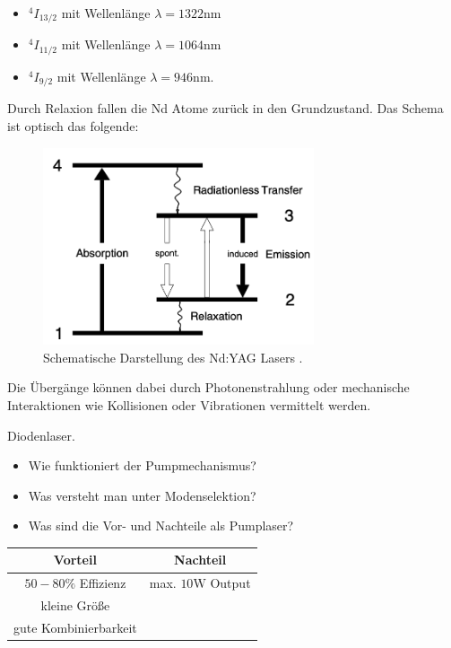 \documentclass{subfiles}
\begin{document}
\begin{Antwort}
            \begin{itemize}
                \item $^4I_{13/2}$ mit Wellenlänge $\lambda = 1322\si{\nano\meter}$
                \item $^4I_{11/2}$ mit Wellenlänge $\lambda = 1064\si{\nano\meter}$
                \item $^4I_{9/2}$ mit Wellenlänge $\lambda = 946\si{\nano\meter}$.
            \end{itemize}
            Durch Relaxion fallen die Nd Atome zurück in den Grundzustand. Das Schema ist optisch das folgende:
            \begin{figure}
                \centering
                \includegraphics[width=8cm]{Bilddateien/SchemaNdYAG.png}
                \caption{Schematische Darstellung des Nd:YAG Lasers \cite{exp8-paper}.}
                \label{fig:SchemaNdYAG}
            \end{figure}
            Die Übergänge können dabei durch Photonenstrahlung oder mechanische Interaktionen wie Kollisionen oder Vibrationen vermittelt werden. 
    \end{Antwort}

    \begin{Frage}
        Diodenlaser.
        \begin{itemize}[label=$\to$]
            \item Wie funktioniert der Pumpmechanismus?
            \item Was versteht man unter Modenselektion?
            \item Was sind die Vor- und Nachteile als Pumplaser?
        \end{itemize}
    \end{Frage}
    \begin{Antwort}


        \begin{table}
            \centering
            \begin{tabular}{|c|c|}\hline
                \textbf{Vorteil} & \textbf{Nachteil} \\\hline\hline
                $50-80\si{\percent}$ Effizienz & max. $10\si{\watt}$ Output\\
                kleine Größe & \\
                gute Kombinierbarkeit & \\

            \end{tabular}
        \end{table}
    \end{Antwort}
\end{document}
